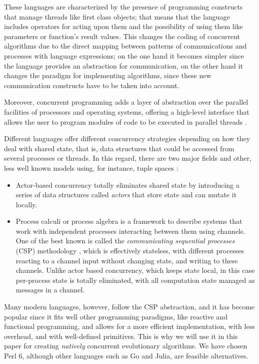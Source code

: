 \documentclass[sigconf]{acmart}\usepackage[]{graphicx}\usepackage[]{color}
\begin{document}
These languages are characterized by the presence of
programming constructs that manage threads like first class
objects; that means that the language includes  operators for acting upon them and the
possibility of using them like parameters or function's result
values. This changes the coding of concurrent algorithms due to the
direct mapping between patterns of communications and processes with
language expressions; on the one hand it becomes simpler since the
language provides an abstraction for communication, on the other hand
it changes the paradigm for implementing algorithms, since these new
communication constructs have to be taken into account. 

Moreover, concurrent programming adds a layer of abstraction over the parallel
facilities of processors and operating systems, offering a
high-level interface that allows the user to program modules of code to
be executed in parallel threads \cite{andrews1991concurrent}.

Different languages offer different concurrency strategies depending on how they deal with shared state,
that is, data structures that could be accessed from several processes or
threads. In this regard, there are two major fields and other, less well known models using, for instance, tuple
  spaces \cite{gelernter1985generative}:
\begin{itemize}
\item Actor-based concurrency \cite{schippers2009towards}
totally eliminates shared state by introducing a series of data
structures called {\em actors} that
store state and can mutate it locally. 
\item Process calculi or process algebra is a framework to describe
  systems that work with independent
  processes interacting between them using channels. One of the best
  known is called the {\em communicating sequential processes} (CSP)
methodology \cite{Hoare:1978:CSP:359576.359585}, which is effectively
stateless, with different processes reacting to a channel input without
changing state, and writing to these channels. Unlike actor based
concurrency, which keeps state local, in this case per-process state is totally
eliminated, with all computation state managed as messages in a channel.
\end{itemize}

Many modern languages, however, follow the CSP abstraction, and it has
become popular since it fits well other programming paradigms, like
reactive and functional programming, and allows for a more efficient
implementation, with less overhead, and with well-defined
primitives. This is why we will use it in this paper for creating  {\em natively}
concurrent evolutionary algorithms. We have chosen Perl 6, although 
other languages such as Go and Julia, are feasible alternatives.
\end{document}
